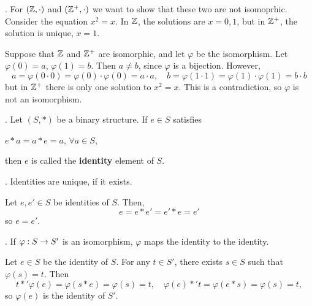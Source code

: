 \ex. For \((\mathbb{Z}, \cdot)\) and \((\mathbb{Z}^+, \cdot)\) we want to show that these two are not isomoprhic. Consider the equation \(x^2 = x\). In \(\mathbb{Z}\), the solutions are \(x = 0, 1\), but in \(\mathbb{Z}^+\), the solution is unique, \(x = 1\).

\pf Suppose that \(\mathbb{Z}\) and \(\mathbb{Z}^+\) are isomorphic, and let \(\varphi\) be the isomorphism. Let \(\varphi(0) = a\), \(\varphi(1) = b\). Then \(a \neq b\), since \(\varphi\) is a bijection. However,
\[
    a = \varphi(0 \cdot 0) = \varphi(0) \cdot \varphi(0) = a \cdot a, \quad
    b = \varphi(1 \cdot 1) = \varphi(1) \cdot \varphi(1) = b \cdot b
\]
but in \(\mathbb{Z}^+\) there is only one solution to \(x^2 = x\). This is a contradiction, so \(\varphi\) is not an isomorphism.

.  Let \((S, *)\) be a binary structure. If \(e \in S\) satisfies
\begin{center}
    \(e * a = a * e = a\), \quad \(\forall a \in S\),
\end{center}
then \(e\) is called the \textbf{identity} element of \(S\).

\thm. Identities are unique, if it exists.

\pf Let \(e, e' \in S\) be identities of \(S\). Then,
\[
    e = e * e' = e' * e = e'
\]
so \(e = e'\).

\thm. If \(\varphi: S \rightarrow S'\) is an isomorphism, \(\varphi\) maps the identity to the identity.

\pf Let \(e \in S\) be the identity of \(S\). For any \(t \in S'\), there exists \(s \in S\) such that \(\varphi(s) = t\). Then
\[
    t *' \varphi(e) = \varphi(s * e) = \varphi(s) = t, \quad
    \varphi(e) *' t = \varphi(e * s) = \varphi(s) = t,
\]
so \(\varphi(e)\) is the identity of \(S'\).

\pagebreak
